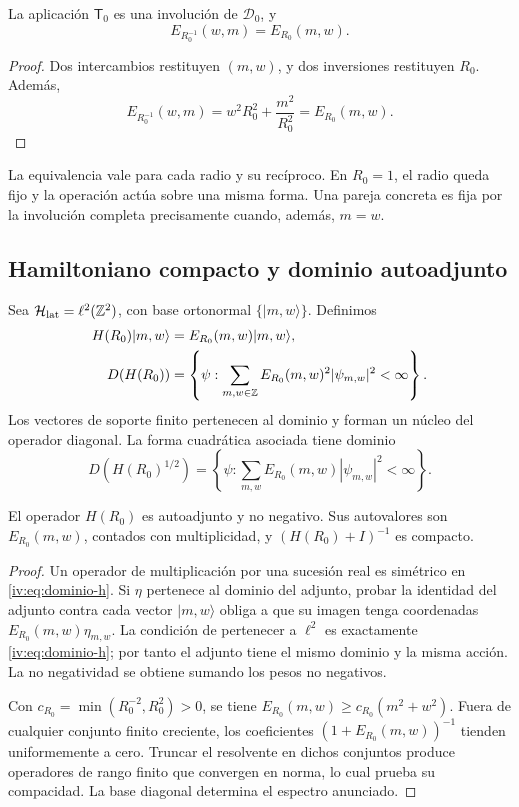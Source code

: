 \begin{theorem}
\label{iv:thm:dualidad-escalar}
La aplicación \(\mathsf T_0\) es una involución de
\(\mathscr D_0\), y
\[
 E_{R_0^{-1}}(w,m)=E_{R_0}(m,w).
\]
\end{theorem}
\begin{proof}
Dos intercambios restituyen \((m,w)\), y dos inversiones restituyen
\(R_0\). Además,
\[
 E_{R_0^{-1}}(w,m)=w^2R_0^2+\frac{m^2}{R_0^2}
 =E_{R_0}(m,w).
\]
\end{proof}

La equivalencia vale para cada radio y su recíproco. En \(R_0=1\),
el radio queda fijo y la operación actúa sobre una misma forma.
Una pareja concreta es fija por la involución completa precisamente
cuando, además, \(m=w\).

\subsection{Hamiltoniano compacto y dominio autoadjunto}

Sea \(\mathcal H_{\mathrm{lat}}=\ell^2(\mathbb Z^2)\), con base
ortonormal \(\{|m,w\rangle\}\). Definimos
\begin{align}
 H(R_0)|m,w\rangle&=E_{R_0}(m,w)|m,w\rangle,\label{iv:eq:hamiltoniano}\\
 D(H(R_0))&=\left\{\psi:\sum_{m,w\in\mathbb Z}
 E_{R_0}(m,w)^2|\psi_{m,w}|^2<\infty\right\}.\label{iv:eq:dominio-h}
\end{align}
Los vectores de soporte finito pertenecen al dominio y forman un
núcleo del operador diagonal. La forma cuadrática asociada tiene
dominio
\[
 D(H(R_0)^{1/2})=\left\{\psi:\sum_{m,w}
 E_{R_0}(m,w)|\psi_{m,w}|^2<\infty\right\}.
\]

\begin{proposition}
\label{iv:prop:h-autoadjunto}
El operador \(H(R_0)\) es autoadjunto y no negativo. Sus
autovalores son \(E_{R_0}(m,w)\), contados con multiplicidad,
y \((H(R_0)+I)^{-1}\) es compacto.
\end{proposition}
\begin{proof}
Un operador de multiplicación por una sucesión real es simétrico
en \eqref{iv:eq:dominio-h}. Si \(\eta\) pertenece al dominio
del adjunto, probar la identidad del adjunto contra cada vector
\(|m,w\rangle\) obliga a que su imagen tenga coordenadas
\(E_{R_0}(m,w)\eta_{m,w}\). La condición de pertenecer a
\(\ell^2\) es exactamente \eqref{iv:eq:dominio-h}; por tanto
el adjunto tiene el mismo dominio y la misma acción. La no
negatividad se obtiene sumando los pesos no negativos.

Con \(c_{R_0}=\min(R_0^{-2},R_0^2)>0\), se tiene
\(E_{R_0}(m,w)\geq c_{R_0}(m^2+w^2)\). Fuera de cualquier
conjunto finito creciente, los coeficientes
\((1+E_{R_0}(m,w))^{-1}\) tienden uniformemente a cero.
Truncar el resolvente en dichos conjuntos produce operadores
de rango finito que convergen en norma, lo cual prueba su
compacidad. La base diagonal determina el espectro anunciado.
\end{proof}

